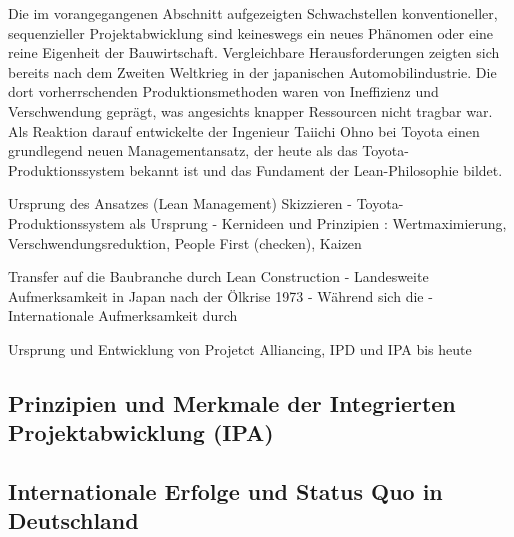 
Die im vorangegangenen Abschnitt aufgezeigten Schwachstellen konventioneller, sequenzieller Projektabwicklung sind keineswegs ein neues Phänomen oder eine reine Eigenheit der Bauwirtschaft. Vergleichbare Herausforderungen zeigten sich bereits nach dem Zweiten Weltkrieg in der japanischen Automobilindustrie. Die dort vorherrschenden Produktionsmethoden waren von Ineffizienz und Verschwendung geprägt, was angesichts knapper Ressourcen nicht tragbar war. Als Reaktion darauf entwickelte der Ingenieur Taiichi Ohno bei Toyota einen grundlegend neuen Managementansatz, der heute als das Toyota-Produktionssystem bekannt ist und das Fundament der Lean-Philosophie bildet.

Ursprung des Ansatzes (Lean Management) Skizzieren
- Toyota-Produktionssystem\autocite[]{ohno_toyota-produktionssystem_2013} als Ursprung
- Kernideen und Prinzipien : Wertmaximierung, Verschwendungsreduktion, People First (checken), Kaizen

Transfer auf die Baubranche durch Lean Construction
- Landesweite Aufmerksamkeit in Japan nach der Ölkrise 1973
- Während sich die 
- Internationale Aufmerksamkeit durch 

Ursprung und Entwicklung von Projetct Alliancing, IPD und IPA bis heute

\subsection{Prinzipien und Merkmale der Integrierten Projektabwicklung (IPA)}
\label{sec:2.2.2}


\subsection{Internationale Erfolge und Status Quo in Deutschland}
\label{sec:2.2.3}


